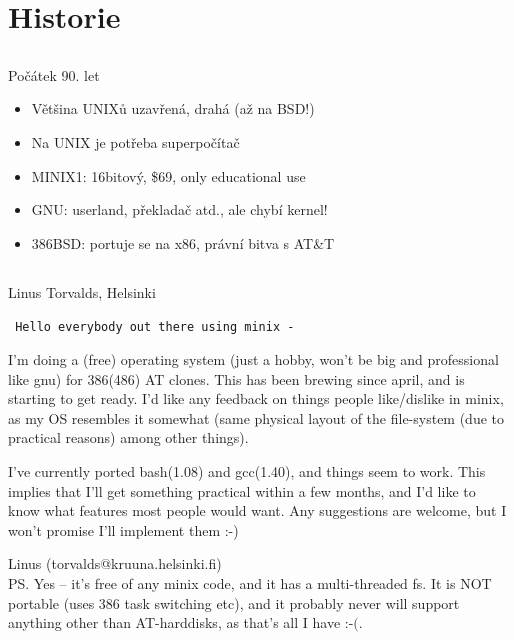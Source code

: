 \documentclass{beamer}
\begin{document}
\section{Historie}

\subsection{}
\begin{frame}{Počátek 90. let}
\begin{itemize}
\item Většina UNIXů uzavřená, drahá (až na BSD!)
\item Na UNIX je potřeba superpočítač
\item MINIX1: 16bitový, \$69, only educational use
\item GNU: userland, překladač atd., ale chybí kernel!
\item 386BSD: portuje se na x86, právní bitva s AT\&T
\end{itemize}
\end{frame}

\subsection{}
\begin{frame}{Linus Torvalds, Helsinki}

{\tt \footnotesize
    Hello everybody out there using minix -

    I'm doing a (free) operating system (just a hobby, won't be big and professional like gnu) for 386(486) AT clones. This has been brewing since april, and is starting to get ready. I'd like any feedback on things people like/dislike in minix, as my OS resembles it somewhat (same physical layout of the file-system (due to practical reasons) among other things).

    I've currently ported bash(1.08) and gcc(1.40), and things seem to work. This implies that I'll get something practical within a few months, and I'd like to know what features most people would want. Any suggestions are welcome, but I won't promise I'll implement them :-)

    Linus (torvalds@kruuna.helsinki.fi) \\
    PS. Yes -- it's free of any minix code, and it has a multi-threaded fs. It is NOT portable (uses 386 task switching etc), and it probably never will support anything other than AT-harddisks, as that's all I have :-$($.
}

\end{frame}
\end{document}
